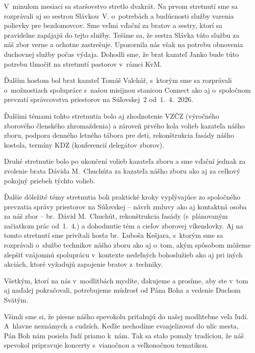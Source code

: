 

V~minulom mesiaci sa staršovstvo stretlo dvakrát. Na prvom stretnutí sme sa rozprávali aj so sestrou Slávkou~V. o~potrebách a budúcnosti služby varenia polievky pre bezdomovcov. Sme veľmi vďační za bratov a sestry, ktorí sa pravidelne zapájajú do tejto služby. Tešíme sa, že sestra Slávka túto službu za náš zbor verne a ochotne zastrešuje. Upozornila nás však na potrebu obnovenia duchovnej služby počas výdaja. Dohodli sme, že brat kazateľ Janko bude túto potrebu tlmočiť na stretnutí pastorov v~rámci KvM.

Ďalším hosťom bol brat kazateľ Tomáš Valchář, s~ktorým sme sa rozprávali o~možnostiach spolupráce s~našou misijnou stanicou Connect ako aj o~spoločnom prevzatí správcovstva priestorov na Súľovskej~2 od~1.~4.~2026.

Ďalšími témami tohto stretnutia bolo aj zhodnotenie VZČZ (výročného zborového členského zhromaždenia) a zároveň prvého kola volieb kazateľa nášho zboru, podpora denného letného tábora pre deti, rekonštrukcia fasády nášho kostola, termíny KDZ (konferencií delegátov zborov).

Druhé stretnutie bolo po ukončení volieb kazateľa zboru a sme vďační jednak za zvolenie brata Dávida M.~Chuchúta za kazateľa nášho zboru ako aj za celkový pokojný priebeh týchto volieb.

Ďalšie dôležité témy stretnutia boli praktické kroky vyplývajúce zo spoločného prevzatia správy priestorov na Súľovskej -- návrh zmluvy ako aj kontaktná osoba za náš zbor -- br.~Dávid M.~Chuchút, rekonštrukcia fasády (s~plánovaným začiatkom prác od~1.~4.) a dohodnutie tém a cieľov zborovej víkendovky. Aj na tomto stretnutí sme privítali hosťa br.~Ľuboša Kešjara, s~ktorým sme sa rozprávali o~službe technikov nášho zboru ako aj o~tom, akým spôsobom môžeme zlepšiť vzájomnú spoluprácu v~kontexte nedeľných bohoslužieb ako aj pri iných akciách, ktoré vyžadujú zapojenie bratov z~techniky.

Všetkým, ktorí na nás v~modlitbách myslíte, ďakujeme a prosíme, aby ste v~tom aj naďalej pokračovali, potrebujeme múdrosť od Pána Boha a vedenie Duchom Svätým.


Všimli sme si, že piesne nášho spevokolu priťahujú do našej modlitebne veľa ľudí. A~hlavne neznámych a cudzích. Keďže nechodíme evanjelizovať do ulíc mesta, Pán Boh nám posiela ľudí priamo k~nám. Tak sa stalo pomaly tradíciou, že náš spevokol pripravuje koncerty s~vianočnou a veľkonočnou tematikou.

